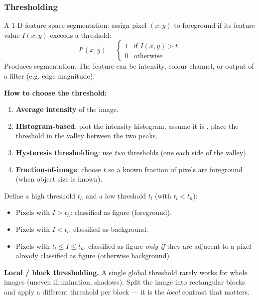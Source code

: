 \bigseparator

\subsubsection{Thresholding}

\begin{defbox}[Thresholding]
A 1-D feature space segmentation: assign pixel $(x,y)$ to foreground if its feature value $I(x,y)$ exceeds a threshold:
\[ I'(x,y) = \begin{cases} 1 & \text{if } I(x,y) > t \\ 0 & \text{otherwise} \end{cases} \]
Produces  segmentation. The feature can be intensity, colour channel, or output of a filter (e.g. edge magnitude).
\end{defbox}

\textbf{How to choose the threshold:}
\begin{enumerate}
  \item \textbf{Average intensity} of the image.
  \item \textbf{Histogram-based}: plot the intensity histogram, assume it is , place the threshold in the valley between the two peaks.
  \item \textbf{Hysteresis thresholding}: use \emph{two} thresholds (one each side of the valley).
  \item \textbf{Fraction-of-image}: choose $t$ so a known fraction of pixels are foreground (when object size is known).
\end{enumerate}

\begin{defbox}
Define a high threshold $t_h$ and a low threshold $t_l$ (with $t_l < t_h$):
\begin{itemize}
  \item Pixels with $I > t_h$: classified as figure (foreground).
  \item Pixels with $I < t_l$: classified as background.
  \item Pixels with $t_l \le I \le t_h$: classified as figure \emph{only if} they are adjacent to a pixel already classified as figure (otherwise background).
\end{itemize}
\end{defbox}

\textbf{Local / block thresholding.} A single global threshold rarely works for whole images (uneven illumination, shadows). Split the image into rectangular blocks and apply a different threshold per block --- it is the \emph{local} contrast that matters.

